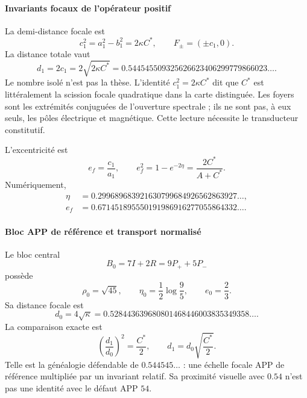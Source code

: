 \paragraph{Invariants focaux de l'opérateur positif}

La demi-distance focale est
\begin{equation}
c_1^2=a_1^2-b_1^2=2\kappa C^*,
\qquad
F_\pm=(\pm c_1,0).
\label{eq:focos}
\end{equation}
La distance totale vaut
\begin{equation}
d_1=2c_1=2\sqrt{2\kappa C^*}
=0.544545509325626623406299779866023\ldots.
\label{eq:d1}
\end{equation}
Le nombre isolé n'est pas la thèse. L'identité \(c_1^2=2\kappa C^*\) dit que
\(C^*\) est littéralement la scission focale quadratique dans la carte
distinguée. Les foyers sont les extrémités conjuguées de l'ouverture spectrale ;
ils ne sont pas, à eux seuls, les pôles électrique et magnétique. Cette lecture nécessite
le transducteur constitutif.

L'excentricité est
\begin{equation}
e_f=\frac{c_1}{a_1},\qquad
e_f^2=1-e^{-2\eta}=\frac{2C^*}{A+C^*}.
\label{eq:excentricidad}
\end{equation}
Numériquement,
\[
\begin{aligned}
\eta&=0.299689683921630799684926562863927\ldots,\\
e_f&=0.671451895550191986916277055864332\ldots.
\end{aligned}
\]

\paragraph{Bloc APP de référence et transport normalisé}

Le bloc central
\[
B_0=7I+2R=9P_++5P_-
\]
possède
\[
\rho_0=\sqrt{45},\qquad
\eta_0=\frac12\log\frac95,\qquad
e_0=\frac23.
\]
Sa distance focale est
\[
d_0=4\sqrt\kappa
=0.528443639680801468446003835349358\ldots.
\]
La comparaison exacte est
\begin{equation}
\boxed{\left(\frac{d_1}{d_0}\right)^2=\frac{C^*}{2}},
\qquad
d_1=d_0\sqrt{\frac{C^*}{2}}.
\label{eq:invariante-focal-relativo}
\end{equation}
Telle est la généalogie défendable de \(0.544545\ldots\) : une échelle focale APP
de référence multipliée par un invariant relatif. Sa proximité visuelle avec
\(0.54\) n'est pas une identité avec le défaut APP \(54\).

